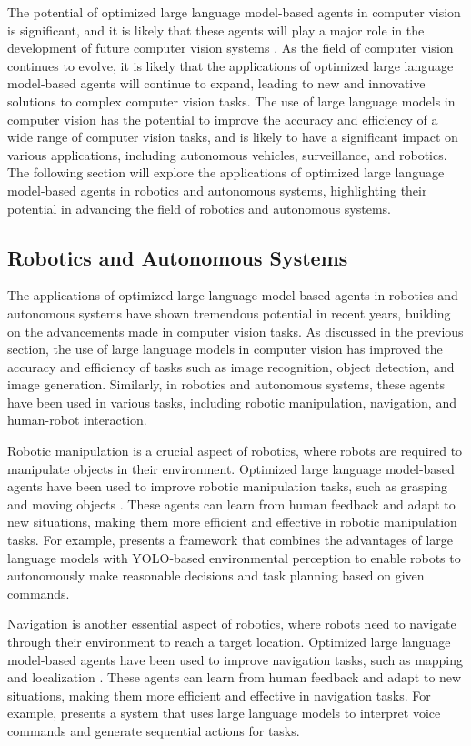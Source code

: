 \documentclass[11pt]{article}
\begin{document}
The potential of optimized large language model-based agents in computer vision is significant, and it is likely that these agents will play a major role in the development of future computer vision systems \cite{ref20}. As the field of computer vision continues to evolve, it is likely that the applications of optimized large language model-based agents will continue to expand, leading to new and innovative solutions to complex computer vision tasks. The use of large language models in computer vision has the potential to improve the accuracy and efficiency of a wide range of computer vision tasks, and is likely to have a significant impact on various applications, including autonomous vehicles, surveillance, and robotics. The following section will explore the applications of optimized large language model-based agents in robotics and autonomous systems, highlighting their potential in advancing the field of robotics and autonomous systems.

\subsection{Robotics and Autonomous Systems}

The applications of optimized large language model-based agents in robotics and autonomous systems have shown tremendous potential in recent years, building on the advancements made in computer vision tasks. As discussed in the previous section, the use of large language models in computer vision has improved the accuracy and efficiency of tasks such as image recognition, object detection, and image generation. Similarly, in robotics and autonomous systems, these agents have been used in various tasks, including robotic manipulation, navigation, and human-robot interaction.

Robotic manipulation is a crucial aspect of robotics, where robots are required to manipulate objects in their environment. Optimized large language model-based agents have been used to improve robotic manipulation tasks, such as grasping and moving objects \cite{ref236}. These agents can learn from human feedback and adapt to new situations, making them more efficient and effective in robotic manipulation tasks. For example, \cite{ref237} presents a framework that combines the advantages of large language models with YOLO-based environmental perception to enable robots to autonomously make reasonable decisions and task planning based on given commands.

Navigation is another essential aspect of robotics, where robots need to navigate through their environment to reach a target location. Optimized large language model-based agents have been used to improve navigation tasks, such as mapping and localization \cite{ref238}. These agents can learn from human feedback and adapt to new situations, making them more efficient and effective in navigation tasks. For example, \cite{ref239} presents a system that uses large language models to interpret voice commands and generate sequential actions for tasks.
\end{document}
